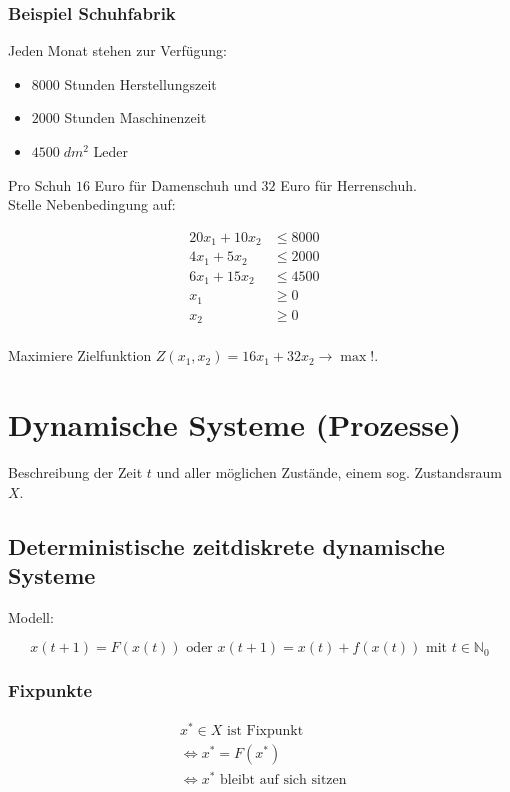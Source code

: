 \documentclass[a4paper]{article}
\newcommand{\N}{\mathbb{N}}
\begin{document}
\subsubsection{Beispiel Schuhfabrik}

Jeden Monat stehen zur Verfügung:

\begin{itemize}
	\item $8000$ Stunden Herstellungszeit
	\item $2000$ Stunden Maschinenzeit
	\item $4500\; dm ^2$ Leder
\end{itemize}

Pro Schuh $16$ Euro für Damenschuh und $32$ Euro für Herrenschuh.
\\

Stelle Nebenbedingung auf:

\begin{align*}
	20 x_1 + 10 x_2 & \leq 8000 \\
	4 x_1 + 5 x_2 & \leq 2000 \\
	6 x_1 + 15 x_2 & \leq 4500 \\
	x_1 & \geq 0 \\
	x_2 & \geq 0 & \\
\end{align*}

Maximiere Zielfunktion $Z(x_1, x_2) = 16 x_1 + 32 x_2 \rightarrow \max !$.

\section{Dynamische Systeme (Prozesse)}

Beschreibung der Zeit $t$ und aller möglichen Zustände, einem sog.
Zustandsraum $X$.

\subsection{Deterministische zeitdiskrete dynamische Systeme}

Modell:

\[
	x(t+1) = F(x(t)) \text{ oder } x(t+1) = x(t) + f(x(t))
	\text{ mit } t \in \N_0
\] 

\subsubsection{Fixpunkte}

\begin{align*}
	& x ^{*} \in X \text{ ist Fixpunkt } \\
	& \Leftrightarrow x ^{*} = F ( x ^{*} ) \\
	& \Leftrightarrow x ^{*} \text{ bleibt auf sich sitzen }
\end{align*}
\end{document}
